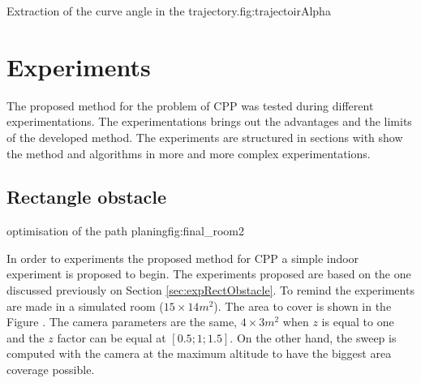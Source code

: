  \begin{mfigures}[!]{Extraction of the curve angle in the trajectory.}{fig:trajectoirAlpha} \centering
{}
\end{mfigures} 
	
	
				



			\section{Experiments} \label{sec:experiment}
			
The proposed method for the problem of CPP was tested during different experimentations. The experimentations brings out the advantages and the limits of the developed method. The experiments are structured in sections with show the method and algorithms in more and more complex experimentations.

\subsection{Rectangle obstacle} \label{experiment}

 \begin{mfigures}[!]{optimisation of the path planing}{fig:final_room2} \centering
\hspace{1cm}

\tabsVrepPath
\end{mfigures} 

In order to experiments the proposed method for CPP a simple indoor experiment is proposed to begin.
The experiments proposed are based on the one discussed previously on Section \ref{sec:expRectObstacle}.
To remind the experiments are made in a simulated room ($15 \times 14 m^2$). The area to cover is shown in the Figure . The camera parameters are the same, $4 \times 3 m^2$ when $z$ is equal to one and the $z$ factor can be equal at $[0.5;1;1.5]$. On the other hand, the sweep is computed with the camera at the maximum altitude to have the biggest area coverage possible.

